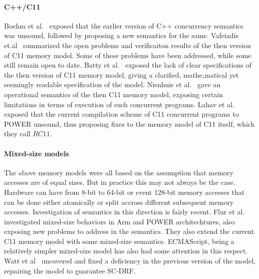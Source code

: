 \paragraph{C++/C11}
Boehm et al.~\cite{Boehm} exposed that the earlier version of C++ concurrency semantics was unsound, followed by proposing a new semantics for the same.
Vafeiadis et.al~\cite{Vafeiadis2} summarized the open problems and verificaiton results of the then version of C11 memory model. Some of these problems have been addressed, while some still remain open to date. 
Batty et al.~\cite{BattyM} exposed the lack of clear specifications of the then version of C11 memory model, giving a clarified, mathe,matical yet seemingly readable specification of the model.
Nienhuis et al.~\cite{Nienhuis} gave an operational semantics of the then C11 memory model, exposing certain limitations in terms of execution of such concurrent programs.
Lahav et al.~\cite{Lahav} exposed that the current compilation scheme of C11 concurrent programs to POWER unsound, thus proposing fixes to the memory model of C11 itself, which they call $RC11$.

\paragraph{Mixed-size models}
The above memory models were all based on the assumption that memory accesses are of equal sizes. But in practice this may not always be the case. Hardware can have from 8-bit to 64-bit or event 128-bit memory accesses that can be done either atomically or split accross different subsequent memory accesses. 
Investigation of semantics in this direction is fairly recent.
Flur et al.~\cite{Flur} investigated mixed-size behaviors in Arm and POWER architechtures, also exposing new problems to address in the semantics. They also extend the current C11 memory model with some mixed-size semantics.
ECMAScript, being a relatively simpler mixed-size model has also had some attention in this respect. Watt et al~\cite{WattC} uncovered and fixed a deficiency in the previous version of the model, repairing the model to guarantee SC-DRF.

